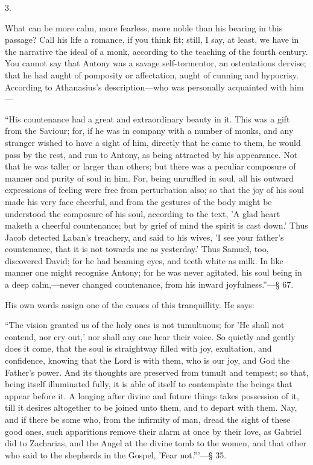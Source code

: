 3.

What can be more calm, more fearless, more noble than his bearing
in this passage? Call his life a romance, if you think fit; still, I
say, at least, we have in the narrative the ideal of a monk, according
to the teaching of the fourth century. You cannot say that Antony was
a savage self-tormentor, an ostentatious dervise; that he had aught of
pomposity or affectation, aught of cunning and hypocrisy. According to
Athanasius's description—who was personally acquainted with him—

``His countenance had a great and extraordinary beauty in it.
This was a gift from the Saviour; for, if he was
in company with a number of monks, and any stranger wished to have a
sight of him, directly that he came to them, he would pass by the
rest, and run to Antony, as being attracted by his appearance. Not
that he was taller or larger than others; but there was a peculiar
composure of manner and purity of soul in him. For, being unruffled in
soul, all his outward expressions of feeling were free from
perturbation also; so that the joy of his soul made his very face
cheerful, and from the gestures of the body might be understood the
composure of his soul, according to the text, 'A glad heart maketh a
cheerful countenance; but by grief of mind the spirit is cast down.'
Thus Jacob detected Laban's treachery, and said to his wives, 'I see
your father's countenance, that it is not towards me as yesterday.'
Thus Samuel, too, discovered David; for he had beaming eyes, and teeth
white as milk. In like manner one might recognise Antony; for he was
never agitated, his soul being in a deep calm,—never changed
countenance, from his inward joyfulness.''—§ 67.

His own words assign one of the causes of this tranquillity. He
says:

``The vision granted us of the holy ones is not tumultuous; for
'He shall not contend, nor cry out,' nor shall any one hear their
voice. So quietly and gently does it come, that the soul is
straightway filled with joy, exultation, and confidence, knowing that
the Lord is with them, who is our joy, and God the Father's power. And
its thoughts are preserved from tumult and tempest; so that, being
itself illuminated fully, it is able of itself to contemplate the
beings that appear before it. A longing after divine and future things
takes possession of it, till it desires altogether to be joined unto
them, and to depart with them. Nay, and if there be some who, from the
infirmity of man, dread the sight of these good ones, such apparitions
remove their alarm at once by their love, as Gabriel did to Zacharias,
and the Angel at the divine tomb to the women, and that other who said
to the shepherds in the Gospel, 'Fear not.'''—§ 35.


